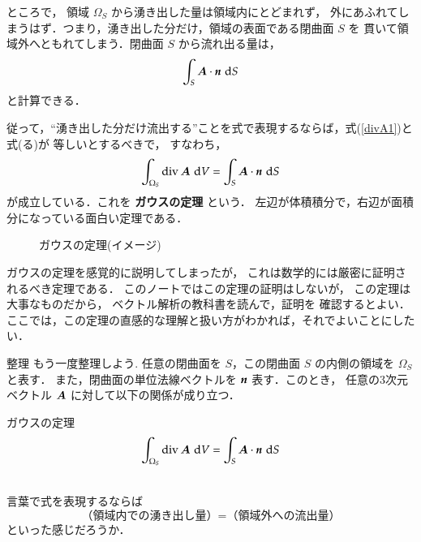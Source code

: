         ところで，
        領域 $\Omega_{S}$ から湧き出した量は領域内にとどまれず，
        外にあふれてしまうはず．つまり，湧き出した分だけ，領域の表面である閉曲面 $S$ を
        貫いて領域外へともれてしまう．閉曲面 $S$ から流れ出る量は，
            \begin{align}\label{intS_A_dS}
                \int_{S} \bA \cdot \textit{\textbf{n}}\,\df S
            \end{align}
        と計算できる．

        従って，“湧き出した分だけ流出する”ことを式で表現するならば，式(\ref{divA1})と式(る)が
        等しいとするべきで，
        すなわち，
            \begin{align}
                \int_{\Omega_{S}} \mathrm{div\,}\boldsymbol{A}\,\,\mathrm{d} V=\int_{S} \boldsymbol{A} \cdot \textit{\textbf{n}}\,\,\mathrm{d} S
            \end{align}
        が成立している．これを \textbf{ガウスの定理} という．
        左辺が体積積分で，右辺が面積分になっている面白い定理である．
                \begin{figure}[hbt]
                    \begin{center}
                        \caption{ガウスの定理(イメージ)}
                        \label{fig:int_gauss_law1}
                    \end{center}
                \end{figure}


        ガウスの定理を感覚的に説明してしまったが，
        これは数学的には厳密に証明されるべき定理である．
        このノートではこの定理の証明はしないが，
        この定理は大事なものだから，
        ベクトル解析の教科書を読んで，証明を
        確認するとよい．
        ここでは，この定理の直感的な理解と扱い方がわかれば，それでよいことにしたい．

        \begin{memo}{整理}
           もう一度整理しよう.
           任意の閉曲面を $S$，この閉曲面 $S$ の内側の領域を $\Omega_{S}$ と表す．
           また，閉曲面の単位法線ベクトルを $\textit{\textbf{n}}$ 表す．このとき，
           任意の3次元ベクトル $\boldsymbol{A}$ に対して以下の関係が成り立つ．\\
           \begin{itembox}[l]{ガウスの定理}
               \begin{align}
                   \int_{\Omega_{S}} \mathrm{div}\, \boldsymbol{A}\,\,\mathrm{d} V
                   =\int_{S} \boldsymbol{A}\cdot\textit{\textbf{n}}\,\,\mathrm{d} S
               \end{align}
           \end{itembox}\\

           言葉で式を表現するならば
               \begin{equation*}
                   \mbox{（領域内での湧き出し量）}=\mbox{（領域外への流出量）}
               \end{equation*}
           といった感じだろうか．
        \end{memo}

